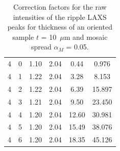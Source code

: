 \begin{table}[htbp]
\begin{tabular}{rrcccc}
    4  & 0  & 1.10 & 2.04 & 0.44  & 0.976   \\
    4  & 1  & 1.22 & 2.04 & 3.28  & 8.153   \\
    4  & 2  & 1.22 & 2.04 & 6.39  & 15.897  \\
    4  & 3  & 1.21 & 2.04 & 9.50  & 23.450  \\
    4  & 4  & 1.20 & 2.04 & 12.60 & 30.981  \\
    4  & 5  & 1.20 & 2.04 & 15.49 & 38.076  \\
    4  & 6  & 1.20 & 2.04 & 18.35 & 45.126  \\
    \hline
    \end{tabular}%
  \caption[Correction factors for the raw intensities of the ripple LAXS 
  peaks for thickness of an oriented sample $t$ = 10~$\mu$m and mosaic
  spread $\alpha_M$ = 0.05\textdegree]
  {Correction factors for the raw intensities of the ripple LAXS 
  peaks for thickness of an oriented sample $t$ = 10~$\mu$m and mosaic
  spread $\alpha_M$ = 0.05\textdegree.}
  \label{tab:LAXS_correction1}%
\end{table}%
    
